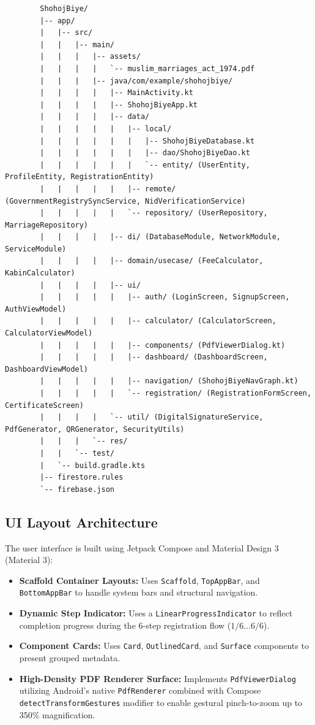 \documentclass[12pt,a4paper]{article}
\begin{document}
	\begin{lstlisting}
		ShohojBiye/
		|-- app/
		|   |-- src/
		|   |   |-- main/
		|   |   |   |-- assets/
		|   |   |   |   `-- muslim_marriages_act_1974.pdf
		|   |   |   |-- java/com/example/shohojbiye/
		|   |   |   |   |-- MainActivity.kt
		|   |   |   |   |-- ShohojBiyeApp.kt
		|   |   |   |   |-- data/
		|   |   |   |   |   |-- local/
		|   |   |   |   |   |   |-- ShohojBiyeDatabase.kt
		|   |   |   |   |   |   |-- dao/ShohojBiyeDao.kt
		|   |   |   |   |   |   `-- entity/ (UserEntity, ProfileEntity, RegistrationEntity)
		|   |   |   |   |   |-- remote/ (GovernmentRegistrySyncService, NidVerificationService)
		|   |   |   |   |   `-- repository/ (UserRepository, MarriageRepository)
		|   |   |   |   |-- di/ (DatabaseModule, NetworkModule, ServiceModule)
		|   |   |   |   |-- domain/usecase/ (FeeCalculator, KabinCalculator)
		|   |   |   |   |-- ui/
		|   |   |   |   |   |-- auth/ (LoginScreen, SignupScreen, AuthViewModel)
		|   |   |   |   |   |-- calculator/ (CalculatorScreen, CalculatorViewModel)
		|   |   |   |   |   |-- components/ (PdfViewerDialog.kt)
		|   |   |   |   |   |-- dashboard/ (DashboardScreen, DashboardViewModel)
		|   |   |   |   |   |-- navigation/ (ShohojBiyeNavGraph.kt)
		|   |   |   |   |   `-- registration/ (RegistrationFormScreen, CertificateScreen)
		|   |   |   |   `-- util/ (DigitalSignatureService, PdfGenerator, QRGenerator, SecurityUtils)
		|   |   |   `-- res/
		|   |   `-- test/
		|   `-- build.gradle.kts
		|-- firestore.rules
		`-- firebase.json
	\end{lstlisting}
	
	\subsection{UI Layout Architecture}
	The user interface is built using Jetpack Compose and Material Design 3 (Material 3):
	\begin{itemize}
		\item \textbf{Scaffold Container Layouts:} Uses \texttt{Scaffold}, \texttt{TopAppBar}, and \texttt{BottomAppBar} to handle system bars and structural navigation.
		\item \textbf{Dynamic Step Indicator:} Uses a \texttt{LinearProgressIndicator} to reflect completion progress during the 6-step registration flow ($1/6 \dots 6/6$).
		\item \textbf{Component Cards:} Uses \texttt{Card}, \texttt{OutlinedCard}, and \texttt{Surface} components to present grouped metadata.
		\item \textbf{High-Density PDF Renderer Surface:} Implements \texttt{PdfViewerDialog} utilizing Android's native \texttt{PdfRenderer} combined with Compose \texttt{detectTransformGestures} modifier to enable gestural pinch-to-zoom up to 350\% magnification.
	\end{itemize}
	
\end{document}
